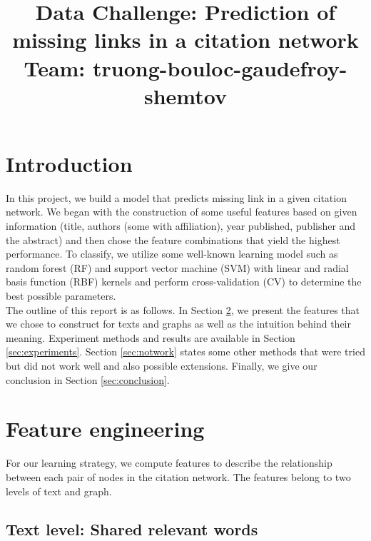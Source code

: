 \documentclass{article}
\title{Data Challenge: Prediction of missing links in a citation network\\Team: truong-bouloc-gaudefroy-shemtov}
\begin{document}
\ninept

\maketitle


\section{Introduction}

In this project, we build a model that predicts missing link in a given citation network. We began with the construction of some useful features based on given information (title, authors (some with affiliation), year published, publisher and the abstract) and then chose the feature combinations that yield the highest performance. To classify, we utilize some well-known learning model such as random forest (RF) and support vector machine (SVM) with linear and radial basis function (RBF) kernels and perform cross-validation (CV) to determine the best possible parameters.\\
The outline of this report is as follows. In Section \ref{sec:feature}, we present the features that we chose to construct for texts and graphs as well as the intuition behind their meaning. Experiment methods and results are available in Section \ref{sec:experiments}. Section \ref{sec:notwork} states some other methods that were tried but did not work well and also possible extensions. Finally, we give our conclusion in Section \ref{sec:conclusion}.

\section{Feature engineering}
\label{sec:feature}
For our learning strategy, we compute features to describe the relationship between each pair of nodes in the citation network. The features belong to two levels of text and graph.

\subsection{Text level: Shared relevant words}
\end{document}
